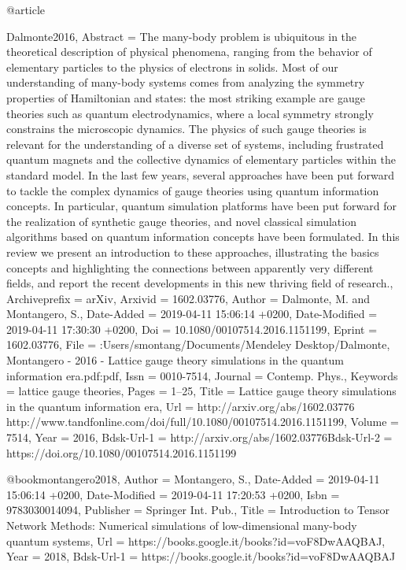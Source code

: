 \documentclass[epj,final]{svjour}
\begin{document}
@article{Dalmonte2016,
	Abstract = {The many-body problem is ubiquitous in the theoretical description of physical phenomena, ranging from the behavior of elementary particles to the physics of electrons in solids. Most of our understanding of many-body systems comes from analyzing the symmetry properties of Hamiltonian and states: the most striking example are gauge theories such as quantum electrodynamics, where a local symmetry strongly constrains the microscopic dynamics. The physics of such gauge theories is relevant for the understanding of a diverse set of systems, including frustrated quantum magnets and the collective dynamics of elementary particles within the standard model. In the last few years, several approaches have been put forward to tackle the complex dynamics of gauge theories using quantum information concepts. In particular, quantum simulation platforms have been put forward for the realization of synthetic gauge theories, and novel classical simulation algorithms based on quantum information concepts have been formulated. In this review we present an introduction to these approaches, illustrating the basics concepts and highlighting the connections between apparently very different fields, and report the recent developments in this new thriving field of research.},
	Archiveprefix = {arXiv},
	Arxivid = {1602.03776},
	Author = {Dalmonte, M. and Montangero, S.},
	Date-Added = {2019-04-11 15:06:14 +0200},
	Date-Modified = {2019-04-11 17:30:30 +0200},
	Doi = {10.1080/00107514.2016.1151199},
	Eprint = {1602.03776},
	File = {:Users/smontang/Documents/Mendeley Desktop/Dalmonte, Montangero - 2016 - Lattice gauge theory simulations in the quantum information era.pdf:pdf},
	Issn = {0010-7514},
	Journal = {Contemp. Phys.},
	Keywords = {lattice gauge theories},
	Pages = {1--25},
	Title = {{Lattice gauge theory simulations in the quantum information era}},
	Url = {http://arxiv.org/abs/1602.03776 http://www.tandfonline.com/doi/full/10.1080/00107514.2016.1151199},
	Volume = {7514},
	Year = {2016},
	Bdsk-Url-1 = {http://arxiv.org/abs/1602.03776Bdsk-Url-2 = {https://doi.org/10.1080/00107514.2016.1151199}}

@book{montangero2018,
	Author = {Montangero, S.},
	Date-Added = {2019-04-11 15:06:14 +0200},
	Date-Modified = {2019-04-11 17:20:53 +0200},
	Isbn = {9783030014094},
	Publisher = {Springer Int. Pub.},
	Title = {Introduction to Tensor Network Methods: Numerical simulations of low-dimensional many-body quantum systems},
	Url = {https://books.google.it/books?id=voF8DwAAQBAJ},
	Year = {2018},
	Bdsk-Url-1 = {https://books.google.it/books?id=voF8DwAAQBAJ}}

}
\end{document}
